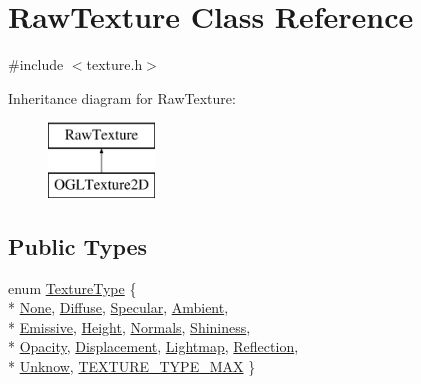 \hypertarget{class_raw_texture}{}\section{Raw\+Texture Class Reference}
\label{class_raw_texture}


{\ttfamily \#include $<$texture.\+h$>$}

Inheritance diagram for Raw\+Texture\+:\begin{figure}[H]
\begin{center}
\leavevmode
\includegraphics[height=2.000000cm]{class_raw_texture}
\end{center}
\end{figure}
\subsection*{Public Types}
\begin{DoxyCompactItemize}
\item 
enum \hyperlink{class_raw_texture_ac0eafe7206f7f38aeb4e8e5631480f6d}{Texture\+Type} \{ \\*
\hyperlink{class_raw_texture_ac0eafe7206f7f38aeb4e8e5631480f6da78fec4598173ba0ac7e88172f904bf14}{None}, 
\hyperlink{class_raw_texture_ac0eafe7206f7f38aeb4e8e5631480f6da103010e71865c656628def4a68509078}{Diffuse}, 
\hyperlink{class_raw_texture_ac0eafe7206f7f38aeb4e8e5631480f6da376419225ba86ef2cef8deaf4b5d2cc0}{Specular}, 
\hyperlink{class_raw_texture_ac0eafe7206f7f38aeb4e8e5631480f6dae40768618fb98d5bf8f8b508beee978d}{Ambient}, 
\\*
\hyperlink{class_raw_texture_ac0eafe7206f7f38aeb4e8e5631480f6da129d22adf6decce68912629eb9d86f4c}{Emissive}, 
\hyperlink{class_raw_texture_ac0eafe7206f7f38aeb4e8e5631480f6da36aa55c6d051efa1528323021dc6bfdb}{Height}, 
\hyperlink{class_raw_texture_ac0eafe7206f7f38aeb4e8e5631480f6da31db990e66434b96fc42213080e8aee5}{Normals}, 
\hyperlink{class_raw_texture_ac0eafe7206f7f38aeb4e8e5631480f6da22852ea63e2e64bdcda0650e6226bc8f}{Shininess}, 
\\*
\hyperlink{class_raw_texture_ac0eafe7206f7f38aeb4e8e5631480f6da578768bb075d4923ac61b46940c5fa83}{Opacity}, 
\hyperlink{class_raw_texture_ac0eafe7206f7f38aeb4e8e5631480f6da18c524764d6c9260aa6d2e140219c303}{Displacement}, 
\hyperlink{class_raw_texture_ac0eafe7206f7f38aeb4e8e5631480f6da5d61225d770ccb26dd0467db41c49c40}{Lightmap}, 
\hyperlink{class_raw_texture_ac0eafe7206f7f38aeb4e8e5631480f6daeb9ce3fdf067487fa1c3c543eadcb995}{Reflection}, 
\\*
\hyperlink{class_raw_texture_ac0eafe7206f7f38aeb4e8e5631480f6da80a818ecbfab54372aaa78f8eefff24e}{Unknow}, 
\hyperlink{class_raw_texture_ac0eafe7206f7f38aeb4e8e5631480f6daf629e42f84129e5f38c0b66b4887f09b}{T\+E\+X\+T\+U\+R\+E\+\_\+\+T\+Y\+P\+E\+\_\+\+M\+A\+X}
 \}
\end{DoxyCompactItemize}
